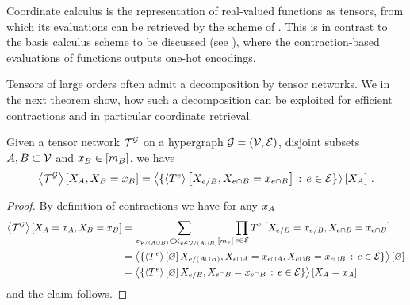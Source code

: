 Coordinate calculus is the representation of real-valued functions as tensors, from which its evaluations can be retrieved by the scheme of .
This is in contrast to the basis calculus scheme to be discussed (see ), where the contraction-based evaluations of functions outputs one-hot encodings.

Tensors of large orders often admit a decomposition by tensor networks.
We in the next theorem show, how such a decomposition can be exploited for efficient contractions and in particular coordinate retrieval.

\begin{theorem}
    \label{the:slicedContractionToCores}
    Given a tensor network $\mathcal{T}^{\mathcal{G}}$ on a hypergraph $\mathcal{G}=(\mathcal{V},\mathcal{E})$, disjoint subsets $A,B\subset\mathcal{V}$ and $x_{B}\in[m_{B}]$, we have
    \begin{align*}
        \left\langle \mathcal{T}^{\mathcal{G}}\right\rangle \left[ X_{A},X_{B}=x_{B} \right]
        = \left\langle 
            \{\left\langle T^{e}\right\rangle \left[ X_{e/B},X_{e\cap B}=x_{e\cap B} \right] \, : \, e\in\mathcal{E} \}
        \right\rangle \left[ X_{A} \right] \, .
    \end{align*}
\end{theorem}
\begin{proof}
    By definition of contractions we have for any $x_{A}$
    \begin{align*}
        \left\langle \mathcal{T}^{\mathcal{G}}\right\rangle \left[ X_{A}=x_{A},X_{B}=x_{B} \right]
        &= \sum_{x_{\mathcal{V}/(A\cup B)}\in\bigtimes_{v\in\mathcal{V}/(A\cup B)}[m_{v}]} \prod_{e\in\mathcal{E}} T^{e}\left[X_{e/B}=x_{e/B},X_{e\cap B}=x_{e\cap B}\right] \\
        &= \left\langle 
            \{\left\langle T^{e}\right\rangle \left[ \varnothing \right]{X_{e/(A\cup B)},X_{e\cap A}=x_{e\cap A},X_{e\cap B}=x_{e\cap B}} \, : \, e\in\mathcal{E} \}
        \right\rangle \left[ \varnothing \right] \\
        &= \left\langle 
            \{\left\langle T^{e}\right\rangle \left[ \varnothing \right]{X_{e/B},X_{e\cap B}=x_{e\cap B}} \, : \, e\in\mathcal{E} \}
        \right\rangle \left[ X_{A}=x_{A} \right]
    \end{align*}
    and the claim follows.
\end{proof}

